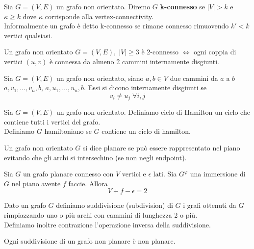 \begin{definizione}
    Sia \(G=(V,E)\) un grafo non orientato. Diremo \(G\) \textbf{k-connesso} se \(|V|>k\) e \(\kappa \geq k\) dove \(\kappa\) corrisponde alla vertex-connectivity.\\
    Informalmente un grafo è detto k-connesso se rimane connesso rimuovendo \(k'<k\) vertici qualsiasi.
\end{definizione}

\begin{teorema}
    Un grafo non orientato \(G=(V,E),\; |V| \geq 3\) è 2-connesso \(\Leftrightarrow\) ogni coppia di vertici \((u,v)\) è connessa da almeno 2 cammini internamente disgiunti.
\end{teorema}

\begin{definizione}
    Sia \(G=(V,E)\) un grafo non orientato, siano \(a,b \in V\) due cammini da \(a\) a \(b\) \(a,v_1,\dots,v_n,b\), \(a,u_1,\dots,u_n,b\). Essi si dicono internamente disgiunti se 
    \begin{equation}
        v_i \neq u_j\; \forall i,j
    \end{equation}
\end{definizione}

\begin{definizione}
    Sia \(G=(V,E)\) un grafo non orientato. Definiamo ciclo di Hamilton un ciclo che contiene tutti i vertici del grafo.\\
    Definiamo \(G\) hamiltoniano se \(G\) contiene un ciclo di hamilton.
\end{definizione}

\begin{definizione}
    Un grafo non orientato \(G\) si dice planare se può essere rappresentato nel piano evitando che gli archi si intersechino (se non negli endpoint).
\end{definizione}

\begin{teorema}\label{formulaeulero}
    Sia \(G\) un grafo planare connesso con \(V\) vertici e \(\epsilon\) lati. Sia \(G^\varphi\) una immersione di \(G\) nel piano avente \(f\) faccie. Allora
    \begin{equation}
        V+f-\epsilon = 2
    \end{equation}
\end{teorema}

\begin{definizione}[Suddivisione]
    Dato un grafo \(G\) definiamo suddivisione (subdivision) di \(G\) i grafi ottenuti da \(G\) rimpiazzando uno o più archi con cammini di lunghezza 2 o più.
    \\ Definiamo inoltre contrazione l'operazione inversa della suddivisione.
\end{definizione}
\begin{lemma}
    Ogni suddivisione di un grafo non planare è non planare.
\end{lemma}

